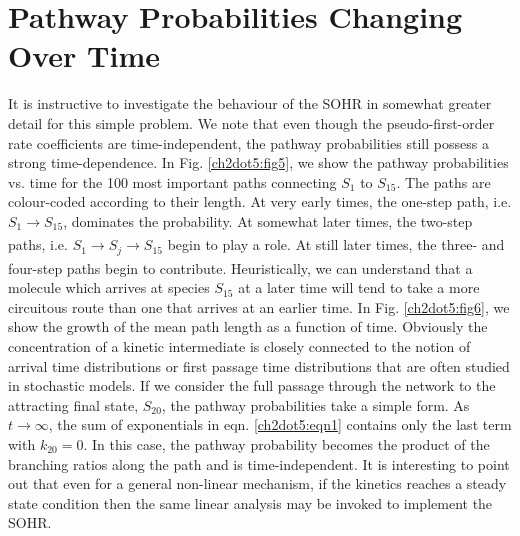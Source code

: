 \section{Pathway Probabilities Changing Over Time}
\label{ch2dot5:sec:p_prob_time}
It is instructive to investigate the behaviour of the SOHR in somewhat greater detail
for this simple problem. We note that even though the pseudo-first-order rate coefficients
are time-independent, the pathway probabilities still possess a strong time-dependence.
In Fig. \ref{ch2dot5:fig5}, we show the pathway probabilities vs. time for the 100 most
important paths connecting $S_1$ to $S_{15}$. The paths are colour-coded according to their
length. At very early times, the one-step path, i.e. $S_1 \xrightarrow[]{} S_{15}$, dominates the probability.
At somewhat later times, the two-step paths, i.e. $S_1 \xrightarrow[]{} S_j \xrightarrow[]{} S_{15}$ begin to play a role.
At still later times, the three- and four-step paths begin to contribute. Heuristically, we can understand that a molecule which arrives at species $S_{15}$ at a later time will tend to take a more circuitous route than one that arrives at an earlier time. In Fig. \ref{ch2dot5:fig6}, we
show the growth of the mean path length as a function of time. Obviously the concentration
of a kinetic intermediate is closely connected to the notion of arrival time distributions
or first passage time distributions that are often studied in stochastic models.\cite{ch1_IRPC_33_van1992stochastic} If we consider the full passage through the network to the attracting final state,
$S_{20}$, the pathway probabilities take a simple form. As $t \rightarrow \infty$, the sum of exponentials in eqn. \ref{ch2dot5:eqn1} contains only the last term with $k_{20} = 0$. In this case, the pathway
probability becomes the product of the branching ratios along the path and is time-independent.
It is interesting to point out that even for a general non-linear mechanism, if
the kinetics reaches a steady state condition then the same linear analysis may be
invoked to implement the SOHR.
